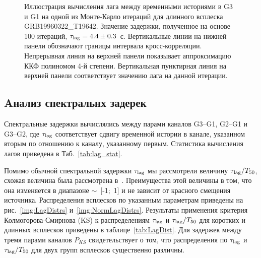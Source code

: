 \begin{figure}[h]
  \caption{Иллюстрация вычисления лага между временными историями в G3 и G1 
  на одной из Монте-Карло итераций для длинного всплеска GRB19960322\_T19642. 
  Значение задержки, полученное на основе 100 итераций,  $\tau_{\mathrm{lag}}=4.4\pm0.3$~с. 
  Вертикальные линии на нижней панели обозначают границы интервала кросс-корреляции. 
  Непрерывная линия на верхней панели показывает аппроксимацию ККФ полиномом 4-й степени. 
  Вертикальная пунктирная линия на верхней панели соответствует значению лага на данной итерации.
  \label{fig:lag_calculation}}  
\end{figure}

\subsection{Aнализ спектральнх задерек}
Спектральные задержки вычислялись между парами каналов G3--G1, G2--G1 и G3--G2, 
где $\tau_{\mathrm{lag}}$ соответствует сдвигу временной истории в канале, указанном вторым
по отношению к каналу, указанному первым. Статистика вычисления лагов приведена в Таб.~\ref{tab:lag_stat}.



Помимо обычной спектральной задержки $\tau_{\mathrm{lag}}$ мы рассмотрели величину 
$\tau_{\mathrm{lag}} / T_{50}$, схожая величина была рассмотрена в~\citep{Ripa_2012}. 
Преимущества этой величины в том, что она изменяется в диапазоне $\sim$~[-1;~1] и 
не зависит от красного смещения источника.  Распределения всплесков по указанным 
параметрам приведены на рис.~\ref{img:LagDistrs} и~\ref{img:NormLagDistrs}. 
Результаты применения критерия Колмогорова-Смирнова (KS) к распределениям 
$\tau_{\mathrm{lag}}$ и $\tau_{\mathrm{lag}} / T_{50}$ для коротких и длинных всплесков 
приведены в таблице~\ref{tab:LagDist}. Для задержек между тремя парами каналов 
$P_{KS}$ свидетельствует о том, что распределения по $\tau_{\mathrm{lag}}$ 
и $\tau_{\mathrm{lag}} / T_{50}$  для двух групп всплесков существенно различны. 

